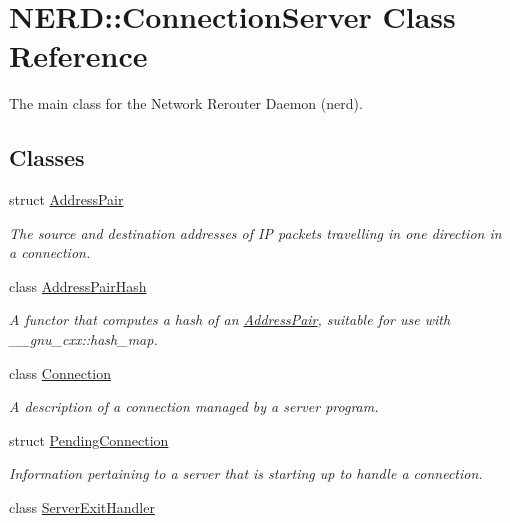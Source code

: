 \hypertarget{classNERD_1_1ConnectionServer}{
\section{\-N\-E\-R\-D\-:\-:\-Connection\-Server \-Class \-Reference}
\label{classNERD_1_1ConnectionServer}
}


\-The main class for the \-Network \-Rerouter \-Daemon (nerd).  


\subsection*{\-Classes}
\begin{DoxyCompactItemize}
\item 
struct \hyperlink{structNERD_1_1ConnectionServer_1_1AddressPair}{\-Address\-Pair}
\begin{DoxyCompactList}\small\item\em \-The source and destination addresses of \-I\-P packets travelling in one direction in a connection. \end{DoxyCompactList}\item 
class \hyperlink{classNERD_1_1ConnectionServer_1_1AddressPairHash}{\-Address\-Pair\-Hash}
\begin{DoxyCompactList}\small\item\em \-A functor that computes a hash of an \hyperlink{structNERD_1_1ConnectionServer_1_1AddressPair}{\-Address\-Pair}, suitable for use with \-\_\-\-\_\-gnu\-\_\-cxx\-::hash\-\_\-map. \end{DoxyCompactList}\item 
class \hyperlink{classNERD_1_1ConnectionServer_1_1Connection}{\-Connection}
\begin{DoxyCompactList}\small\item\em \-A description of a connection managed by a server program. \end{DoxyCompactList}\item 
struct \hyperlink{structNERD_1_1ConnectionServer_1_1PendingConnection}{\-Pending\-Connection}
\begin{DoxyCompactList}\small\item\em \-Information pertaining to a server that is starting up to handle a connection. \end{DoxyCompactList}\item 
class \hyperlink{classNERD_1_1ConnectionServer_1_1ServerExitHandler}{\-Server\-Exit\-Handler}

\end{DoxyCompactItemize}
